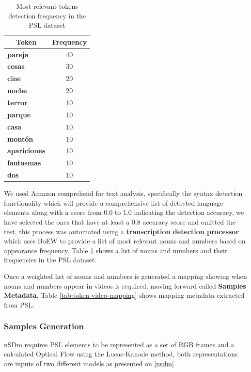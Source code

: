 \documentclass[twocolumn,conference]{article}
\begin{document}
\begin{table}[!htb]
\captionsetup{size=footnotesize}
\begin{tabular}{ p{16em} c}
\toprule
\multicolumn{1}{c}{\textbf{Token}} & 
	\multicolumn{1}{c}{\textbf{Frequency}}\\
\midrule
\textbf{pareja}&	40\\
\textbf{cosas}&	30\\
\textbf{cine}&	20\\
\textbf{noche}&	20\\
\textbf{terror}&	10\\
\textbf{parque}&	10\\
\textbf{casa}&	10\\
\textbf{montón}&	10\\
\textbf{apariciones}&	10\\
\textbf{fantasmas}&	10\\
\textbf{dos}&	10\\
\bottomrule
\end{tabular}
\caption{Most relevant tokens detection frequency in the PSL dataset} \label{tab:token-freq}
\end{table}

We used Amazon comprehend for text analysis, specifically the syntax detection functionality which will provide a comprehensive list of detected language elements along with a score from 0.0 to 1.0 indicating the detection accuracy, we have selected the ones that have at least a 0.8 accuracy score and omitted the rest, this process was automated using a \textbf{transcription detection processor} which uses BoEW to provide a list of most relevant nouns and numbers based on appearance frequency. Table \ref{tab:token-freq} shows a list of nouns and numbers and their frequencies in the PSL dataset.

Once a weighted list of nouns and numbers is generated a mapping showing when nouns and numbers appear in videos is required, moving forward called \textbf{Samples Metadata}. Table \ref{tab:token-video-mapping} shows mapping metadata extracted from PSL.

\subsubsection{Samples Generation}\label{samples-generation} 
nSDm requires PSL elements to be represented as a set of RGB frames and a calculated Optical Flow using the Lucas-Kanade method, both representations are inputs of two different models as presented on \ref{nsdm}.
\end{document}
